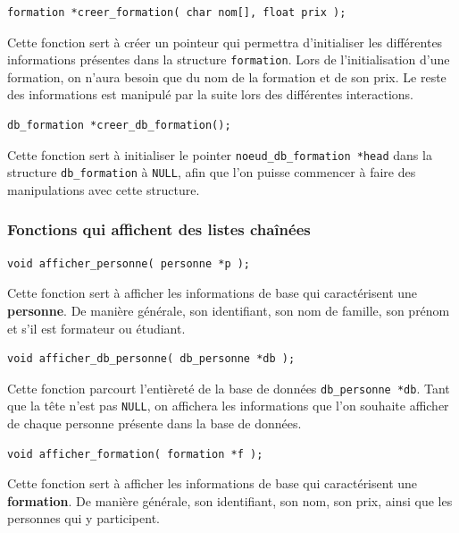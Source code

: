 \documentclass[11pt]{article}
\begin{document}
\begin{lstlisting}[firstnumber=303]
  formation *creer_formation( char nom[], float prix );
\end{lstlisting}

Cette fonction sert à créer un pointeur qui permettra d'initialiser les différentes informations présentes dans la structure \texttt{formation}. Lors de l'initialisation d'une formation, on n'aura besoin que du nom de la formation et de son prix. Le reste des informations est manipulé par la suite lors des différentes interactions.

\begin{lstlisting}[firstnumber=442]
  db_formation *creer_db_formation();
\end{lstlisting}

Cette fonction sert à initialiser le pointer \texttt{noeud\_db\_formation *head} dans la structure \texttt{db\_formation} à \texttt{NULL}, afin que l'on puisse commencer à faire des manipulations avec cette structure.

\subsubsection{Fonctions qui affichent des listes chaînées}

\begin{lstlisting}[firstnumber=157]
  void afficher_personne( personne *p );
\end{lstlisting}

Cette fonction sert à afficher les informations de base qui caractérisent une \textbf{personne}. De manière générale, son identifiant, son nom de famille, son prénom et s'il est formateur ou étudiant.

\begin{lstlisting}[firstnumber=257]
  void afficher_db_personne( db_personne *db );
\end{lstlisting}

Cette fonction parcourt l'entièreté de la base de données \texttt{db\_personne *db}. Tant que la tête n'est pas \texttt{NULL}, on affichera les informations que l'on souhaite afficher de chaque personne présente dans la base de données.

\begin{lstlisting}[firstnumber=408]
  void afficher_formation( formation *f );
\end{lstlisting}

Cette fonction sert à afficher les informations de base qui caractérisent une \textbf{formation}. De manière générale, son identifiant, son nom, son prix, ainsi que les personnes qui y participent.
\end{document}
